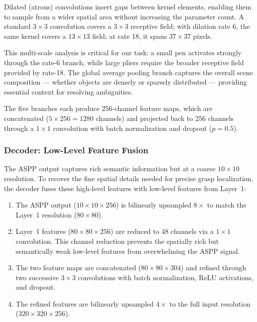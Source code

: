 \documentclass[12pt, a4paper]{article}
\begin{document}
Dilated (atrous) convolutions insert gaps between kernel elements, enabling them to sample from a wider spatial area without increasing the parameter count. A standard $3 \times 3$ convolution covers a $3 \times 3$ receptive field; with dilation rate 6, the same kernel covers a $13 \times 13$ field; at rate 18, it spans $37 \times 37$ pixels.

This multi-scale analysis is critical for our task: a small pen activates strongly through the rate-6 branch, while large pliers require the broader receptive field provided by rate-18. The global average pooling branch captures the overall scene composition — whether objects are densely or sparsely distributed — providing essential context for resolving ambiguities.

The five branches each produce 256-channel feature maps, which are concatenated ($5 \times 256 = 1280$ channels) and projected back to 256 channels through a $1 \times 1$ convolution with batch normalization and dropout ($p = 0.5$).

\subsubsection{Decoder: Low-Level Feature Fusion}

The ASPP output captures rich semantic information but at a coarse $10 \times 10$ resolution. To recover the fine spatial details needed for precise grasp localization, the decoder fuses these high-level features with low-level features from Layer~1:

\begin{enumerate}[leftmargin=2em]
    \item The ASPP output ($10 \times 10 \times 256$) is bilinearly upsampled $8\times$ to match the Layer~1 resolution ($80 \times 80$).
    \item Layer~1 features ($80 \times 80 \times 256$) are reduced to 48 channels via a $1 \times 1$ convolution. This channel reduction prevents the spatially rich but semantically weak low-level features from overwhelming the ASPP signal.
    \item The two feature maps are concatenated ($80 \times 80 \times 304$) and refined through two successive $3 \times 3$ convolutions with batch normalization, ReLU activations, and dropout.
    \item The refined features are bilinearly upsampled $4\times$ to the full input resolution ($320 \times 320 \times 256$).
\end{enumerate}
\end{document}
